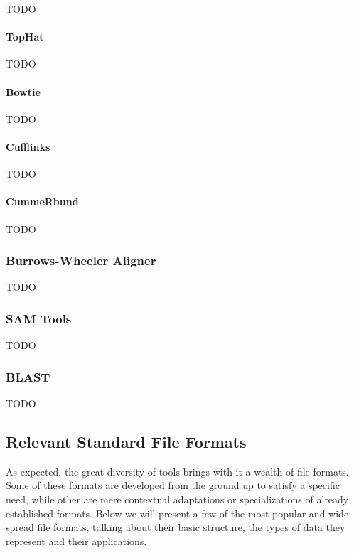 TODO\\

\paragraph{TopHat}

TODO\\

\paragraph{Bowtie}

TODO\\

\paragraph{Cufflinks}

TODO\\

\paragraph{CummeRbund}

TODO\\

\subsubsection*{Burrows-Wheeler Aligner}

TODO\\

\subsubsection*{SAM Tools}

TODO\\

\subsubsection*{BLAST}

TODO\\

\subsection{Relevant Standard File Formats}\label{sec:formats}

As expected, the great diversity of \rnaseq{} tools brings with it a wealth of
file formats. Some of these formats are developed from the ground up to satisfy
a specific need, while other are mere contextual adaptations or specializations
of already established formats. Below we will present a few of the most popular
and wide spread file formats, talking about their basic structure, the types of
data they represent and their applications.

